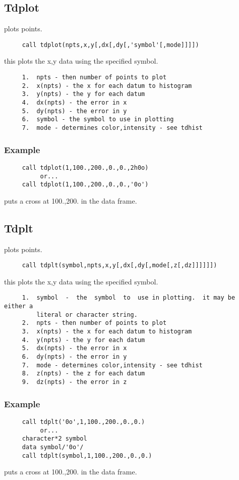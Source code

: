 \subsection{Tdplot}
plots points.  
\begin{verbatim}
     call tdplot(npts,x,y[,dx[,dy[,'symbol'[,mode]]]]) 
\end{verbatim}
this plots the x,y data using the specified symbol.  

\begin{verbatim}
     1.  npts - then number of points to plot 
     2.  x(npts) - the x for each datum to histogram 
     3.  y(npts) - the y for each datum 
     4.  dx(npts) - the error in x 
     5.  dy(npts) - the error in y 
     6.  symbol - the symbol to use in plotting 
     7.  mode - determines color,intensity - see tdhist 
\end{verbatim}
\subsubsection{Example}
\begin{verbatim}
     call tdplot(1,100.,200.,0.,0.,2h0o) 
          or...  
     call tdplot(1,100.,200.,0.,0.,'0o') 
\end{verbatim}
puts a cross at 100.,200.  in the data frame.  
\subsection{Tdplt}
plots points.  
\begin{verbatim}
     call tdplt(symbol,npts,x,y[,dx[,dy[,mode[,z[,dz]]]]]]) 
\end{verbatim}
this plots the x,y data using the specified symbol.  

\begin{verbatim}
     1.  symbol  -  the  symbol  to  use in plotting.  it may be either a
         literal or character string.  
     2.  npts - then number of points to plot 
     3.  x(npts) - the x for each datum to histogram 
     4.  y(npts) - the y for each datum 
     5.  dx(npts) - the error in x 
     6.  dy(npts) - the error in y 
     7.  mode - determines color,intensity - see tdhist 
     8.  z(npts) - the z for each datum 
     9.  dz(npts) - the error in z 
\end{verbatim}
\subsubsection{Example}
\begin{verbatim}
     call tdplt('0o',1,100.,200.,0.,0.) 
          or...  
     character*2 symbol 
     data symbol/'0o'/ 
     call tdplt(symbol,1,100.,200.,0.,0.) 
\end{verbatim}
puts a cross at 100.,200.  in the data frame.  
